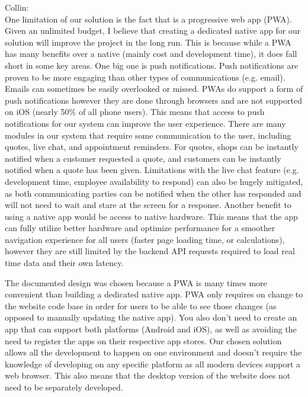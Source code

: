 \documentclass[12pt, titlepage]{article}
\begin{document}
Collin:\\
One limitation of our solution is the fact that is a progressive web app (PWA). Given an unlimited budget, I believe that creating a dedicated native app for our solution will improve the project in the long run. This is because while a PWA has many benefits over a native (mainly cost and development time), it does fall short in some key areas. One big one is push notifications. Push notifications are proven to be more engaging than other types of communications (e.g. email). Emails can sometimes be easily overlooked or missed. PWAs do support a form of push notifications however they are done through browsers and are not supported on iOS (nearly 50\% of all phone users). This means that access to push notifications for our system can improve the user experience. There are many modules in our system that require some communication to the user, including quotes, live chat, and appointment reminders. For quotes, shops can be instantly notified when a customer requested a quote, and customers can be instantly notified when a quote has been given. Limitations with the live chat feature (e.g. development time, employee availability to respond) can also be hugely mitigated, as both communicating parties can be notified when the other has responded and will not need to wait and stare at the screen for a response. Another benefit to using a native app would be access to native hardware. This means that the app can fully utilize better hardware and optimize performance for a smoother navigation experience for all users (faster page loading time, or calculations), however they are still limited by the backend API requests required to load real time data and their own latency.

The documented design was chosen because a PWA is many times more convenient than building a dedicated native app. PWA only requires on change to the website code base in order for users to be able to see those changes (as opposed to manually updating the native app). You also don't need to create an app that can support both platforms (Android and iOS), as well as avoiding the need to register the apps on their respective app stores. Our chosen solution allows all the development to happen on one environment and doesn't require the knowledge of developing on any specific platform as all modern devices support a web browser. This also means that the desktop version of the website does not need to be separately developed. 
\end{document}
